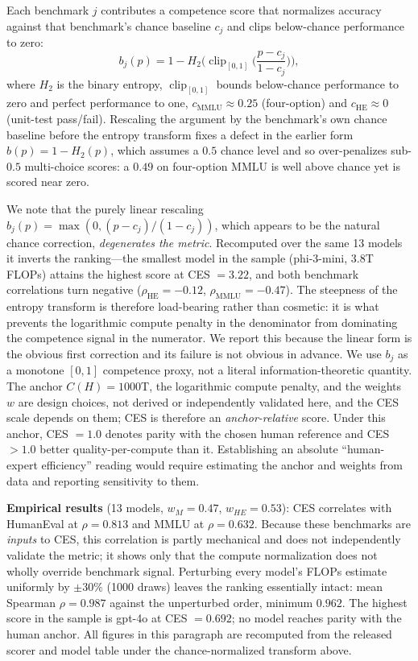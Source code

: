 \documentclass[12pt]{article}
\begin{document}
Each benchmark $j$ contributes a competence score that normalizes accuracy against that benchmark's chance baseline $c_j$ and clips below-chance performance to zero:
\begin{equation}
b_j(p) = 1 - H_2\!\Big(\operatorname{clip}_{[0,1]}\!\Big(\frac{p - c_j}{1 - c_j}\Big)\Big),
\end{equation}
where $H_2$ is the binary entropy, $\operatorname{clip}_{[0,1]}$ bounds below-chance performance to zero and perfect performance to one, $c_{\text{MMLU}} \approx 0.25$ (four-option) and $c_{\text{HE}} \approx 0$ (unit-test pass/fail). Rescaling the argument by the benchmark's own chance baseline before the entropy transform fixes a defect in the earlier form $b(p) = 1 - H_2(p)$, which assumes a $0.5$ chance level and so over-penalizes sub-$0.5$ multi-choice scores: a $0.49$ on four-option MMLU is well above chance yet is scored near zero.

We note that the purely linear rescaling $b_j(p) = \max(0, (p-c_j)/(1-c_j))$, which appears to be the natural chance correction, \emph{degenerates the metric}. Recomputed over the same 13 models it inverts the ranking---the smallest model in the sample (phi-3-mini, 3.8T FLOPs) attains the highest score at CES $=3.22$, and both benchmark correlations turn negative ($\rho_{\text{HE}} = -0.12$, $\rho_{\text{MMLU}} = -0.47$). The steepness of the entropy transform is therefore load-bearing rather than cosmetic: it is what prevents the logarithmic compute penalty in the denominator from dominating the competence signal in the numerator. We report this because the linear form is the obvious first correction and its failure is not obvious in advance. We use $b_j$ as a monotone $[0,1]$ competence proxy, not a literal information-theoretic quantity. The anchor $C(H)=1000$T, the logarithmic compute penalty, and the weights $w$ are design choices, not derived or independently validated here, and the CES scale depends on them; CES is therefore an \emph{anchor-relative} score. Under this anchor, CES $=1.0$ denotes parity with the chosen human reference and CES $>1.0$ better quality-per-compute than it. Establishing an absolute ``human-expert efficiency'' reading would require estimating the anchor and weights from data and reporting sensitivity to them.

\textbf{Empirical results} (13 models, $w_M = 0.47$, $w_{HE} = 0.53$): CES correlates with HumanEval at $\rho = 0.813$ and MMLU at $\rho = 0.632$. Because these benchmarks are \emph{inputs} to CES, this correlation is partly mechanical and does not independently validate the metric; it shows only that the compute normalization does not wholly override benchmark signal. Perturbing every model's FLOPs estimate uniformly by $\pm 30\%$ (1000 draws) leaves the ranking essentially intact: mean Spearman $\rho = 0.987$ against the unperturbed order, minimum $0.962$. The highest score in the sample is gpt-4o at CES $= 0.692$; no model reaches parity with the human anchor. All figures in this paragraph are recomputed from the released scorer and model table under the chance-normalized transform above.
\end{document}
